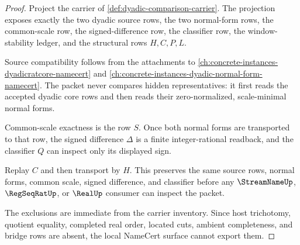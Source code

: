 \begin{proof}
Project the carrier of \autoref{def:dyadic-comparison-carrier}. The projection exposes exactly the two dyadic source rows, the two normal-form rows, the common-scale row, the signed-difference row, the classifier row, the window-stability ledger, and the structural rows $H,C,P,L$.

Source compatibility follows from the attachments to \autoref{ch:concrete-instances-dyadicratcore-namecert} and \autoref{ch:concrete-instances-dyadic-normal-form-namecert}. The packet never compares hidden representatives: it first reads the accepted dyadic core rows and then reads their zero-normalized, scale-minimal normal forms.

Common-scale exactness is the row $S$. Once both normal forms are transported to that row, the signed difference $\Delta$ is a finite integer-rational readback, and the classifier $Q$ can inspect only its displayed sign.

Replay $C$ and then transport by $H$. This preserves the same source rows, normal forms, common scale, signed difference, and classifier before any $\StreamNameUp$, $\RegSeqRatUp$, or $\RealUp$ consumer can inspect the packet.

The exclusions are immediate from the carrier inventory. Since host trichotomy, quotient equality, completed real order, located cuts, ambient completeness, and bridge rows are absent, the local NameCert surface cannot export them.
\end{proof}

